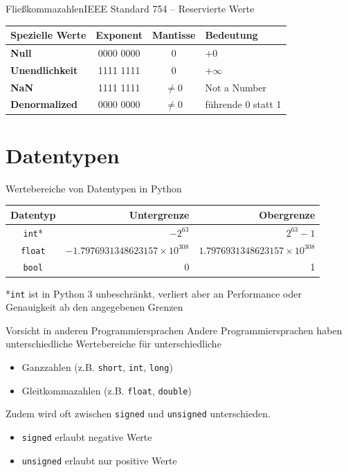 \documentclass[xelatex,aspectratio=169]{beamer}
\begin{document}
\begin{frame}{Fließkommazahlen}{IEEE Standard 754 -- Reservierte Werte}
  \centering
  \begin{tabular}{lccl}
    \toprule{Spezielle Werte} & \textbf{Exponent} & \textbf{Mantisse} & \textbf{Bedeutung} \\
    \midrule
    \textbf{Null}             & 0000 0000         & 0                 & \(+0\)             \\
    \textbf{Unendlichkeit}    & 1111 1111         & 0                 & \(+\infty\)        \\
    \textbf{NaN}              & 1111 1111         & $\neq 0$          & Not a Number       \\
    \textbf{Denormalized}     & 0000 0000         & $\neq 0$          & führende 0 statt 1 \\
    \bottomrule
  \end{tabular}
\end{frame}

\section{Datentypen}
\begin{frame}{Wertebereiche von Datentypen in Python}
  \centering
  \begin{tabular}{crr}
    \toprule
    \textbf{Datentyp} & \textbf{Untergrenze}                  & \textbf{Obergrenze}                  \\
    \midrule
    \texttt{int}*     & $-2^{63}$                             & $2^{63}-1$                           \\
    \texttt{float}    & $-1.7976931348623157 \times 10^{308}$ & $1.7976931348623157 \times 10^{308}$ \\
    \texttt{bool}     & 0                                     & 1                                    \\
    \bottomrule
  \end{tabular}

  *\texttt{int} ist in Python 3 unbeschränkt, verliert aber an Performance oder Genauigkeit ab den angegebenen Grenzen

  \begin{alertblock}{Vorsicht in anderen Programmiersprachen}
    Andere Programmiersprachen haben unterschiedliche Wertebereiche für unterschiedliche
    \begin{itemize}
      \item Ganzzahlen (z.B. \texttt{short}, \texttt{int}, \texttt{long})
      \item Gleitkommazahlen (z.B. \texttt{float}, \texttt{double})
    \end{itemize}
    Zudem wird oft zwischen \texttt{signed} und \texttt{unsigned} unterschieden.
    \begin{itemize}
      \item \texttt{signed} erlaubt negative Werte
      \item \texttt{unsigned} erlaubt nur positive Werte
    \end{itemize}

  \end{alertblock}
\end{frame}
\end{document}
